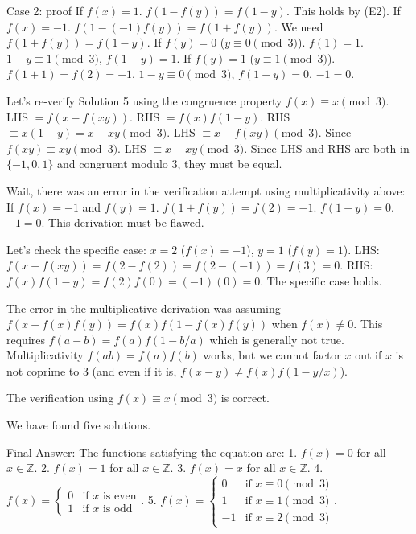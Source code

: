 \documentclass{article} %
\begin{document}
\begin{promptbox}{Case 2: proof}
If $f(x)=1$. $f(1-f(y)) = f(1-y)$. This holds by (E2).
If $f(x)=-1$. $f(1-(-1)f(y)) = f(1+f(y))$. We need $f(1+f(y)) = f(1-y)$.
If $f(y)=0$ ($y \equiv 0 \pmod 3$). $f(1)=1$. $1-y \equiv 1 \pmod 3$, $f(1-y)=1$.
If $f(y)=1$ ($y \equiv 1 \pmod 3$). $f(1+1)=f(2)=-1$. $1-y \equiv 0 \pmod 3$, $f(1-y)=0$. $-1=0$.

Let's re-verify Solution 5 using the congruence property $f(x) \equiv x \pmod 3$.
LHS $= f(x-f(xy))$. RHS $= f(x)f(1-y)$.
RHS $\equiv x(1-y) = x-xy \pmod 3$.
LHS $\equiv x-f(xy) \pmod 3$. Since $f(xy) \equiv xy \pmod 3$.
LHS $\equiv x-xy \pmod 3$.
Since LHS and RHS are both in $\{-1, 0, 1\}$ and congruent modulo 3, they must be equal.

Wait, there was an error in the verification attempt using multiplicativity above:
If $f(x)=-1$ and $f(y)=1$. $f(1+f(y)) = f(2)=-1$. $f(1-y)=0$. $-1=0$. This derivation must be flawed.

Let's check the specific case: $x=2$ ($f(x)=-1$), $y=1$ ($f(y)=1$).
LHS: $f(x-f(xy)) = f(2-f(2)) = f(2-(-1)) = f(3)=0$.
RHS: $f(x)f(1-y) = f(2)f(0) = (-1)(0) = 0$.
The specific case holds.

The error in the multiplicative derivation was assuming $f(x-f(x)f(y)) = f(x)f(1-f(x)f(y))$ when $f(x) \neq 0$. This requires $f(a-b)=f(a)f(1-b/a)$ which is generally not true. Multiplicativity $f(ab)=f(a)f(b)$ works, but we cannot factor $x$ out if $x$ is not coprime to 3 (and even if it is, $f(x-y) \neq f(x)f(1-y/x)$).

The verification using $f(x) \equiv x \pmod 3$ is correct.

We have found five solutions.

Final Answer:
The functions satisfying the equation are:
1. $f(x)=0$ for all $x\in\mathbb{Z}$.
2. $f(x)=1$ for all $x\in\mathbb{Z}$.
3. $f(x)=x$ for all $x\in\mathbb{Z}$.
4. $f(x) = \begin{cases} 0 & \text{if } x \text{ is even} \\ 1 & \text{if } x \text{ is odd} \end{cases}$.
5. $f(x) = \begin{cases} 0 & \text{if } x \equiv 0 \pmod 3 \\ 1 & \text{if } x \equiv 1 \pmod 3 \\ -1 & \text{if } x \equiv 2 \pmod 3 \end{cases}$.
\end{promptbox}
\end{document}
